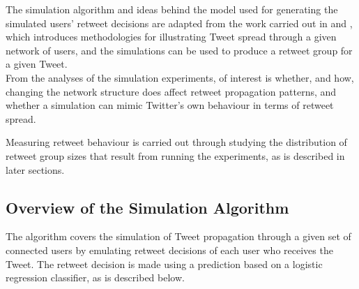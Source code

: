 The simulation algorithm and ideas behind the model used for generating the simulated users' retweet decisions are adapted from the work carried out in \cite{zhu11} and \cite{peng11}, which introduces methodologies for illustrating Tweet spread through a given network of users, and the simulations can be used to produce a retweet group for a given Tweet.\\
From the analyses of the simulation experiments, of interest is whether, and how, changing the network structure does affect retweet propagation patterns, and whether a simulation can mimic Twitter's own behaviour in terms of retweet spread.

Measuring retweet behaviour is carried out through studying the distribution of retweet group sizes that result from running the experiments, as is described in later sections.


\subsection{Overview of the Simulation Algorithm}
The algorithm covers the simulation of Tweet propagation through a given set of connected users by emulating retweet decisions of each user who receives the Tweet. The retweet decision is made using a prediction based on a logistic regression classifier, as is described below.

